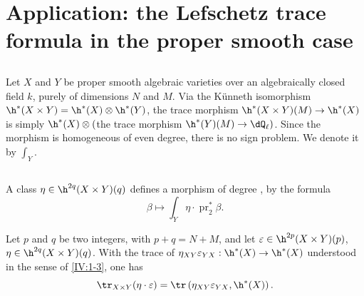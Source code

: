 \section{Application: the Lefschetz trace formula in the proper smooth case}\label{IV:3}






\subsection{}\label{IV:3-1}

Let $X$ and $Y$ be proper smooth algebraic varieties over an algebraically
closed field $k$, purely of dimensions $N$ and $M$. Via the K\"unneth
isomorphism $\h^*(X\times Y)=\h^*(X)\otimes \h^*(Y)$, the
trace morphism $\h^*(X\times Y)(M)\to \h^*(X)$ is simply
$\h^*(X)\otimes ($the trace morphism
$\h^*(Y)(M)\to \dQ_\ell)$. Since the morphism is homogeneous of even
degree, there is no sign problem. We denote it by $\int_Y$.






\subsection{}\label{IV:3-2}

A class $\eta\in \h^{2 q}(X\times Y)(q)$ defines a morphism of degree
, by the formula
\[
  \beta \mapsto \int_Y \eta\cdot \operatorname{pr}_2^\ast \beta \text{.}
\]






\begin{proposition_}\label{IV:3-3}
Let $p$ and $q$ be two integers, with $p+q=N+M$, and let
$\varepsilon\in \h^{2 p}(X\times Y)(p)$,
$\eta\in \h^{2 q}(X\times Y)(q)$. With the trace of
$\eta_{X Y}\varepsilon_{Y X}:\h^*(X)\to \h^*(X)$ understood in
the sense of \ref{IV:1-3}, one has
\[
  \tr_{X\times Y}(\eta\cdot \varepsilon) = \tr\left(\eta_{X Y}\varepsilon_{Y X},\h^*(X)\right) \text{.}
\]
\end{proposition_}

